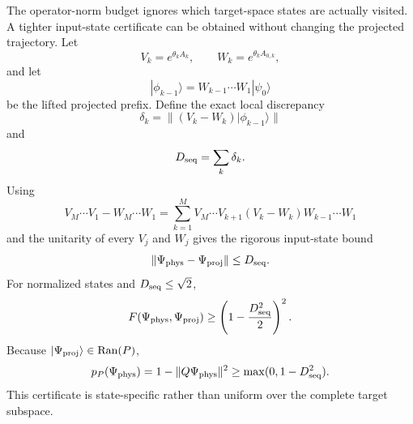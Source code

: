 \documentclass[
 aip,
 jcp,
 amsmath,amssymb,
 preprint
]{revtex4-2}
\begin{document}
The operator-norm budget ignores which target-space states are actually visited.
A tighter input-state certificate can be obtained without changing the projected trajectory.
Let
\begin{equation}
V_k=e^{\theta_kA_k},
\qquad
W_k=e^{\theta_kA_{0,k}},
\end{equation}
and let
\begin{equation}
|\phi_{k-1}\rangle
=
W_{k-1}\cdots W_1|\psi_0\rangle
\end{equation}
be the lifted projected prefix.
Define the exact local discrepancy
\begin{equation}
\delta_k
=
\|(V_k-W_k)|\phi_{k-1}\rangle\|
\end{equation}
and
\begin{equation}
D_{\rm seq}=\sum_k\delta_k.
\label{eq:Dseq}
\end{equation}
Using
\begin{equation}
V_M\cdots V_1-W_M\cdots W_1
=
\sum_{k=1}^{M}
V_M\cdots V_{k+1}(V_k-W_k)W_{k-1}\cdots W_1
\end{equation}
and the unitarity of every $V_j$ and $W_j$ gives the rigorous input-state bound
\begin{equation}
\|\Psi_{\rm phys}-\Psi_{\rm proj}\|
\le D_{\rm seq}.
\end{equation}
For normalized states and $D_{\rm seq}\le\sqrt2$,
\begin{equation}
F(\Psi_{\rm phys},\Psi_{\rm proj})
\ge
\left(1-\frac{D_{\rm seq}^2}{2}\right)^2.
\label{eq:Fcert}
\end{equation}
Because $|\Psi_{\rm proj}\rangle\in{\rm Ran}(P)$,
\begin{equation}
p_P(\Psi_{\rm phys})
=
1-\|Q\Psi_{\rm phys}\|^2
\ge
\max(0,1-D_{\rm seq}^2).
\label{eq:Pcert}
\end{equation}
This certificate is state-specific rather than uniform over the complete target subspace.
\end{document}
